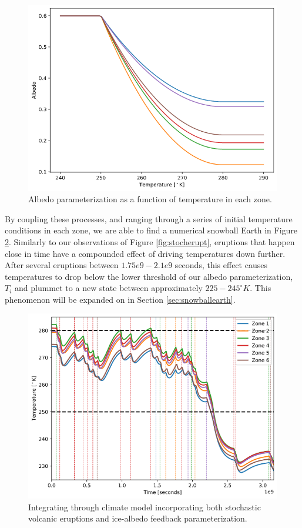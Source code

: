 \documentclass{article}
\begin{document}
\begin{figure}[H]
    \centering
    \includegraphics[scale=0.4]{albedotemp.png}
    \caption{
        Albedo parameterization as a function of temperature in each zone.
    }
    \label{fig:albedotemp}
\end{figure}
\FloatBarrier

By coupling these processes, and ranging through a series of initial temperature
conditions in each zone, we are able to find a numerical snowball Earth in
Figure \ref{fig:fireandice}. Similarly to our observations of Figure
\ref{fig:stocherupt}, eruptions that happen close in time have a compounded
effect of driving temperatures down further. After several eruptions between
$1.75e9-2.1e9$ seconds, this effect causes temperatures to drop below the lower
threshold of our albedo parameterization, $T_i$ and plummet to a new state
between approximately $225-245^{\circ}K$. This phenomenon will be expanded on
in Section \ref{sec:snowballearth}.

\begin{figure}[H]
    \centering
    \includegraphics[scale=0.4]{eruptandice.png}
    \caption{
        Integrating through climate model incorporating both stochastic volcanic
        eruptions and ice-albedo feedback parameterization.
    }
    \label{fig:fireandice}
\end{figure}
\FloatBarrier
\end{document}
